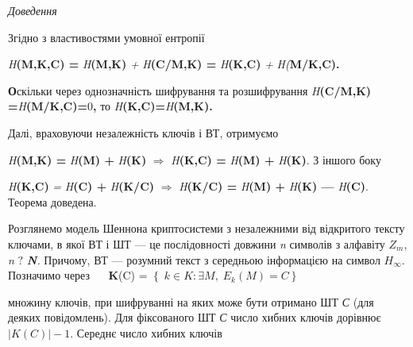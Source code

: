 {\itshape
Доведення }

\textit{ }Згідно\textit{ }з властивостями умовної ентропії 

\textit{H}\textbf{(}\textbf{M}\textbf{,}\textbf{K}\textbf{,}\textbf{C}\textbf{)
= }\textit{H}\textbf{(}\textbf{M}\textbf{,}\textbf{K}\textbf{) }\textit{+
}\textit{H}\textbf{(}\textbf{C}\textbf{/}\textbf{M}\textbf{,}\textbf{K}\textbf{)
= }\textit{H}\textbf{(}\textbf{K}\textbf{,}\textbf{C}\textbf{) }\textit{+
}\textit{H}\textit{(}\textbf{M}\textbf{/}\textbf{K}\textbf{,}\textbf{C}\textbf{).
}

\textbf{О}скільки через однозначність шифрування та розшифрування 
\textit{H}\textbf{(}\textbf{C}\textbf{/}\textbf{M}\textbf{,}\textbf{K}\textbf{)
=}\textit{H}\textbf{(}\textbf{M}\textbf{/}\textbf{K}\textbf{,}\textbf{C}\textbf{)=}0\textbf{,
}то\textbf{
}\textit{H}\textbf{(}\textbf{K}\textbf{,}\textbf{C}\textbf{)=}\textit{H}\textbf{(}\textbf{M}\textbf{,}\textbf{K}\textbf{)}\textbf{.}\textbf{
}

Далі, враховуючи незалежність ключів і ВТ, отримуємо  \textbf{ }

\textit{H}\textbf{(}\textbf{M}\textbf{,}\textbf{K}\textbf{) =
}\textit{H}\textbf{(}\textbf{M}\textbf{) +
}\textit{H}\textbf{(}\textbf{K}\textbf{) } ${\Rightarrow }$\textit{
}\textit{H}\textbf{(}\textbf{K}\textbf{,}\textbf{C}\textbf{) =
}\textit{H}\textbf{(}\textbf{M}\textbf{) +
}\textit{H}\textbf{(}\textbf{K}\textbf{)}. З іншого боку

\textit{H}\textbf{(}\textbf{K}\textbf{,}\textbf{C}\textbf{) }\textit{=
}\textit{H}\textbf{(}\textbf{C}\textbf{) +
}\textit{H}\textbf{(}\textbf{K}\textbf{/}\textbf{C}\textbf{) } ${\Rightarrow
}$\textbf{ }\textit{H}\textbf{(}\textbf{K}\textbf{/}\textbf{C}\textbf{) =
}\textit{H}\textbf{(}\textbf{M}\textbf{) +
}\textit{H}\textbf{(}\textbf{K}\textbf{) ---
}\textit{H}\textbf{(}\textbf{C}\textbf{)}.\textbf{ }Теорема\textbf{ }доведена.

Розглянемо модель Шеннона  криптосистеми  з незалежними  від відкритого тексту
ключами, в якої ВТ і ШТ --- це послідовності довжини  \textit{n}\textit{ }
символів з алфавіту   ${Z_{{m}}}$,  \textit{n} ${?}$\textit{
}\textbf{\textit{N}}\textit{.}  Причому,  ВТ --- розумний текст з середньою
інформацією на символ  ${H_{{\infty }}}$.  Позначимо  через   $ $   $ $ $ $ $ $
 \textbf{K}(C) =   ${\left\{\;k\in K:\exists
M,\;E_{k}\right.(M)=C\left.\right\}}$

множину ключів, при шифруванні на яких  може бути отримано ШТ  \textit{С} (для
деяких повідомлень). Для фіксованого ШТ  \textit{С}  число хибних ключів
дорівнює   ${|K(C)|-1}$. Середнє число хибних ключів 


